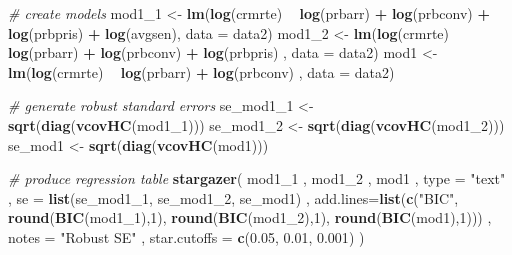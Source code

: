 \documentclass[]{article}
\newenvironment{Shaded}{\begin{snugshade}}{\end{snugshade}}
\newcommand{\CommentTok}[1]{\textcolor[rgb]{0.56,0.35,0.01}{\textit{#1}}}
\newcommand{\DataTypeTok}[1]{\textcolor[rgb]{0.13,0.29,0.53}{#1}}
\newcommand{\DecValTok}[1]{\textcolor[rgb]{0.00,0.00,0.81}{#1}}
\newcommand{\FloatTok}[1]{\textcolor[rgb]{0.00,0.00,0.81}{#1}}
\newcommand{\KeywordTok}[1]{\textcolor[rgb]{0.13,0.29,0.53}{\textbf{#1}}}
\newcommand{\NormalTok}[1]{#1}
\newcommand{\OperatorTok}[1]{\textcolor[rgb]{0.81,0.36,0.00}{\textbf{#1}}}
\newcommand{\StringTok}[1]{\textcolor[rgb]{0.31,0.60,0.02}{#1}}
\begin{document}
\begin{Shaded}
\begin{Highlighting}[]
\CommentTok{# create models}
\NormalTok{mod1_}\DecValTok{1}\NormalTok{ <-}\StringTok{ }\KeywordTok{lm}\NormalTok{(}\KeywordTok{log}\NormalTok{(crmrte) }\OperatorTok{~}\StringTok{ }\KeywordTok{log}\NormalTok{(prbarr) }\OperatorTok{+}\StringTok{ }\KeywordTok{log}\NormalTok{(prbconv) }\OperatorTok{+}\StringTok{ }\KeywordTok{log}\NormalTok{(prbpris) }\OperatorTok{+}\StringTok{ }\KeywordTok{log}\NormalTok{(avgsen), }\DataTypeTok{data =}\NormalTok{ data2)}
\NormalTok{mod1_}\DecValTok{2}\NormalTok{ <-}\StringTok{ }\KeywordTok{lm}\NormalTok{(}\KeywordTok{log}\NormalTok{(crmrte) }\OperatorTok{~}\StringTok{ }\KeywordTok{log}\NormalTok{(prbarr) }\OperatorTok{+}\StringTok{ }\KeywordTok{log}\NormalTok{(prbconv) }\OperatorTok{+}\StringTok{ }\KeywordTok{log}\NormalTok{(prbpris) , }\DataTypeTok{data =}\NormalTok{ data2)}
\NormalTok{mod1 <-}\StringTok{ }\KeywordTok{lm}\NormalTok{(}\KeywordTok{log}\NormalTok{(crmrte) }\OperatorTok{~}\StringTok{ }\KeywordTok{log}\NormalTok{(prbarr) }\OperatorTok{+}\StringTok{ }\KeywordTok{log}\NormalTok{(prbconv) , }\DataTypeTok{data =}\NormalTok{ data2)}

\CommentTok{# generate robust standard errors}
\NormalTok{se_mod1_}\DecValTok{1}\NormalTok{ <-}\StringTok{ }\KeywordTok{sqrt}\NormalTok{(}\KeywordTok{diag}\NormalTok{(}\KeywordTok{vcovHC}\NormalTok{(mod1_}\DecValTok{1}\NormalTok{)))}
\NormalTok{se_mod1_}\DecValTok{2}\NormalTok{ <-}\StringTok{ }\KeywordTok{sqrt}\NormalTok{(}\KeywordTok{diag}\NormalTok{(}\KeywordTok{vcovHC}\NormalTok{(mod1_}\DecValTok{2}\NormalTok{)))}
\NormalTok{se_mod1 <-}\StringTok{ }\KeywordTok{sqrt}\NormalTok{(}\KeywordTok{diag}\NormalTok{(}\KeywordTok{vcovHC}\NormalTok{(mod1)))}

\CommentTok{# produce regression table}
\KeywordTok{stargazer}\NormalTok{(}
\NormalTok{  mod1_}\DecValTok{1}
\NormalTok{  , mod1_}\DecValTok{2}
\NormalTok{  , mod1}
\NormalTok{  , }\DataTypeTok{type =} \StringTok{"text"}
\NormalTok{  , }\DataTypeTok{se =} \KeywordTok{list}\NormalTok{(se_mod1_}\DecValTok{1}\NormalTok{, se_mod1_}\DecValTok{2}\NormalTok{, se_mod1)}
\NormalTok{  , }\DataTypeTok{add.lines=}\KeywordTok{list}\NormalTok{(}\KeywordTok{c}\NormalTok{(}\StringTok{"BIC"}\NormalTok{, }\KeywordTok{round}\NormalTok{(}\KeywordTok{BIC}\NormalTok{(mod1_}\DecValTok{1}\NormalTok{),}\DecValTok{1}\NormalTok{), }\KeywordTok{round}\NormalTok{(}\KeywordTok{BIC}\NormalTok{(mod1_}\DecValTok{2}\NormalTok{),}\DecValTok{1}\NormalTok{), }\KeywordTok{round}\NormalTok{(}\KeywordTok{BIC}\NormalTok{(mod1),}\DecValTok{1}\NormalTok{)))}
\NormalTok{  , }\DataTypeTok{notes =} \StringTok{"Robust SE"}
\NormalTok{  , }\DataTypeTok{star.cutoffs =} \KeywordTok{c}\NormalTok{(}\FloatTok{0.05}\NormalTok{, }\FloatTok{0.01}\NormalTok{, }\FloatTok{0.001}\NormalTok{)}
\NormalTok{)}
\end{Highlighting}
\end{Shaded}
\end{document}
